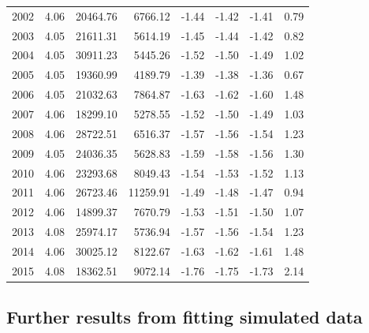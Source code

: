 \documentclass[12pt, letter]{article}
\begin{document}
\begin{table}[ht]
\begin{tabular}{rrrrrrrr}
  2002 & 4.06 & 20464.76 & 6766.12 & -1.44 & -1.42 & -1.41 & 0.79 \\
  2003 & 4.05 & 21611.31 & 5614.19 & -1.45 & -1.44 & -1.42 & 0.82 \\
  2004 & 4.05 & 30911.23 & 5445.26 & -1.52 & -1.50 & -1.49 & 1.02 \\
  2005 & 4.05 & 19360.99 & 4189.79 & -1.39 & -1.38 & -1.36 & 0.67 \\
  2006 & 4.05 & 21032.63 & 7864.87 & -1.63 & -1.62 & -1.60 & 1.48 \\
  2007 & 4.06 & 18299.10 & 5278.55 & -1.52 & -1.50 & -1.49 & 1.03 \\
  2008 & 4.06 & 28722.51 & 6516.37 & -1.57 & -1.56 & -1.54 & 1.23 \\
  2009 & 4.05 & 24036.35 & 5628.83 & -1.59 & -1.58 & -1.56 & 1.30 \\
  2010 & 4.06 & 23293.68 & 8049.43 & -1.54 & -1.53 & -1.52 & 1.13 \\
  2011 & 4.06 & 26723.46 & 11259.91 & -1.49 & -1.48 & -1.47 & 0.94 \\
  2012 & 4.06 & 14899.37 & 7670.79 & -1.53 & -1.51 & -1.50 & 1.07 \\
  2013 & 4.08 & 25974.17 & 5736.94 & -1.57 & -1.56 & -1.54 & 1.23 \\
  2014 & 4.06 & 30025.12 & 8122.67 & -1.63 & -1.62 & -1.61 & 1.48 \\
  2015 & 4.08 & 18362.51 & 9072.14 & -1.76 & -1.75 & -1.73 & 2.14 \\
   \hline
\end{tabular}
\label{tab:annual.fit}
\end{table}

\clearpage

\subsection{Further results from fitting simulated data\label{sec:furtherSim}}
\end{document}
